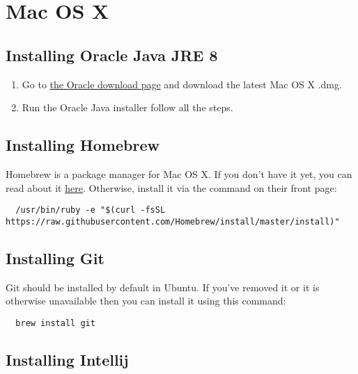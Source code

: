 \documentclass{article}
\begin{document}
\section{Mac OS X}

\subsection{Installing Oracle Java JRE 8}
\begin{enumerate}
  \item
    Go to
    \href{http://www.oracle.com/technetwork/java/javase/downloads/jre8-downloads-2133155.html} {the
    Oracle download page} and download the latest Mac OS X .dmg.
  \item
    Run the Oracle Java installer follow all the steps.
\end{enumerate}

\subsection{Installing Homebrew}
Homebrew is a package manager for Mac OS X. If you don't have it yet, you can read about it
\href{https://brew.sh/} {here}. Otherwise, install it via the command on their front page:
\begin{lstlisting}
  /usr/bin/ruby -e "$(curl -fsSL https://raw.githubusercontent.com/Homebrew/install/master/install)"
\end{lstlisting}

\subsection{Installing Git}
Git should be installed by default in Ubuntu. If you've removed it or it is otherwise unavailable
then you can install it using this command:

\begin{lstlisting}
  brew install git
\end{lstlisting}


	\subsection{Installing Intellij}
\end{document}
